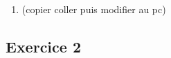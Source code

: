 \documentclass[12pt,a4paper]{scrartcl}
\begin{document}
\begin{enumerate}
\begin{enumerate}
\begin{proof}
\begin{align*}
							     &= |\alpha x_i|\\
							     &= |\alpha||x_i|\\
							     &= |\alpha|||(x_1,x_2)||_{\infty}
			\end{align*}
			\underline{$||(x,y)||_{\infty}=0 \iff (x,y)=(0,0)$:}\\
			\underline{$\implies$:}\\
				On a, pour tout $i\in \{ 1;2\}$, $0\leq |x_i|\leq ||(x_1,x_2)||_{\infty}=0$. Ceci implique $x_1=x_2=0$.\\
			\underline{$\Longleftarrow$:}\\
			On a $||(0,0)||_{\infty}=\max (\{ 0;0\})=0$.
		\end{proof}
		\item (copier coller puis modifier au pc)
		\end{enumerate}
\end{enumerate}
\subsection*{Exercice 2}
\end{document}
